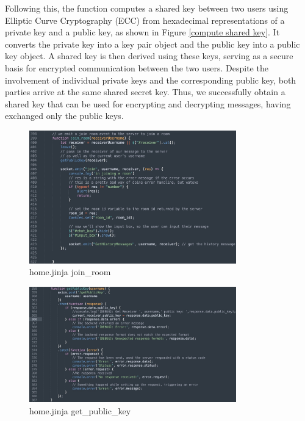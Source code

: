 \documentclass[12pt]{article}
\begin{document}
\begin{enumerate}
            Following this, the function computes a shared key between two users using Elliptic Curve Cryptography (ECC) from hexadecimal representations of a private key and a public key, as shown in Figure \ref{compute shared key}. It converts the private key into a key pair object and the public key into a public key object. A shared key is then derived using these keys, serving as a secure basis for encrypted communication between the two users. Despite the involvement of individual private keys and the corresponding public key, both parties arrive at the same shared secret key. Thus, we successfully obtain a shared key that can be used for encrypting and decrypting messages, having exchanged only the public keys.


            \begin{figure}[H]
                \centering{}
                \includegraphics[width=0.8\textwidth]{graphs/front_join_room.jpg}
                \caption{home.jinja join\_room}
                \label{front join room}
            \end{figure}

            \begin{figure}[H]
                \centering
                \includegraphics[width=0.8\textwidth]{graphs/front_get_public_key}
                \caption{home.jinja get\_public\_key}
                \label{get public key}
            \end{figure}



\end{enumerate}
\end{document}
